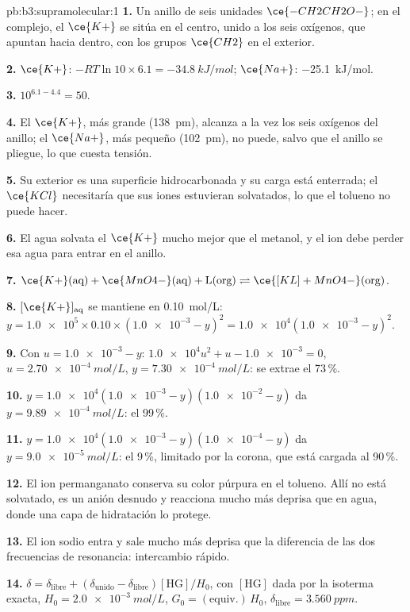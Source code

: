 \begin{solution}{pb:b3:supramolecular:1}
\textbf{1.} Un anillo de seis unidades $\ce{-CH2CH2O-}$; en el complejo, el $\ce{K+}$ se sitúa en el centro, unido a los
seis oxígenos, que apuntan hacia dentro, con los grupos $\ce{CH2}$ en el exterior.

\textbf{2.} $\ce{K+}$: $-RT\ln 10 \times 6.1 = \qty{-34.8}{kJ/mol}$; $\ce{Na+}$: \qty{-25.1}{kJ/mol}.

\textbf{3.} $10^{6.1 - 4.4} = 50$.

\textbf{4.} El $\ce{K+}$, más grande (\qty{138}{pm}), alcanza a la vez los seis oxígenos del anillo; el
$\ce{Na+}$, más pequeño (\qty{102}{pm}), no puede, salvo que el anillo se pliegue, lo que cuesta tensión.

\textbf{5.} Su exterior es una superficie hidrocarbonada y su carga está enterrada; el $\ce{KCl}$
necesitaría que sus iones estuvieran solvatados, lo que el tolueno no puede hacer.

\textbf{6.} El agua solvata el $\ce{K+}$ mucho mejor que el metanol, y el ion debe perder esa
agua para entrar en el anillo.

\textbf{7.} $\ce{K+}(\text{aq}) + \ce{MnO4-}(\text{aq}) + \mathrm L(\text{org}) \rightleftharpoons \ce{[KL]+MnO4-}(\text{org})$.

\textbf{8.} $[\ce{K+}]_{\mathrm{aq}}$ se mantiene en \qty{0.10}{mol/L}: $y = \num{1.0e5} \times 0.10 \times (\num{1.0e-3} - y)^2 = \num{1.0e4}(\num{1.0e-3} - y)^2$.

\textbf{9.} Con $u = \num{1.0e-3} - y$: $\num{1.0e4}u^2 + u - \num{1.0e-3} = 0$, $u = \qty{2.70e-4}{mol/L}$, $y = \qty{7.30e-4}{mol/L}$: se extrae
el 73\,\%.

\textbf{10.} $y = \num{1.0e4}(\num{1.0e-3} - y)(\num{1.0e-2} - y)$ da $y = \qty{9.89e-4}{mol/L}$: el 99\,\%.

\textbf{11.} $y = \num{1.0e4}(\num{1.0e-3} - y)(\num{1.0e-4} - y)$ da $y = \qty{9.0e-5}{mol/L}$: el 9\,\%, limitado por la corona,
que está cargada al 90\,\%.

\textbf{12.} El ion permanganato conserva su color púrpura en el tolueno. Allí
no está solvatado, es un anión desnudo y reacciona mucho más deprisa que en agua, donde una
capa de hidratación lo protege.

\textbf{13.} El ion sodio entra y sale mucho más deprisa que la diferencia de las
dos frecuencias de resonancia: intercambio rápido.

\textbf{14.} $\delta = \delta_{\mathrm{libre}} + (\delta_{\mathrm{unido}} - \delta_{\mathrm{libre}})[\mathrm{HG}]/H_0$, con $[\mathrm{HG}]$ dada por la isoterma exacta, $H_0 = \qty{2.0e-3}{mol/L}$,
$G_0 = (\text{equiv.})\,H_0$, $\delta_{\mathrm{libre}} = \qty{3.560}{ppm}$.


\end{solution}

